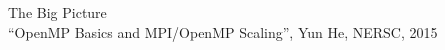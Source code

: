 \begin{frame}{The Big Picture}
   \\
  {\scriptsize ``OpenMP Basics and MPI/OpenMP Scaling'', Yun He, NERSC, 2015}  
\end{frame}

